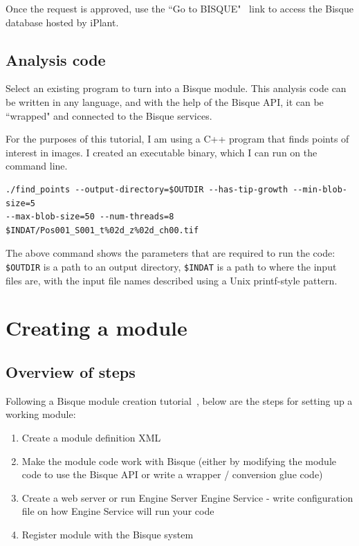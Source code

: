 \documentclass[12pt]{article}
\begin{document}
Once the request is approved, use the 
``Go to BISQUE"~\cite{Bisque-iplant} link to access the 
Bisque database hosted by iPlant.


\subsection{Analysis code}
\label{sec:analysis_code}

Select an existing program to turn into a Bisque module.
This analysis code can be written in any language, and with the help
of the Bisque API, it can be ``wrapped" and connected to the
Bisque services.

For the purposes of this tutorial, I am using a C++ program
that finds points of interest in images. 
I created an executable binary, which I can run on the command line.

\begin{verbatim}
./find_points --output-directory=$OUTDIR --has-tip-growth --min-blob-size=5 
--max-blob-size=50 --num-threads=8 $INDAT/Pos001_S001_t%02d_z%02d_ch00.tif
\end{verbatim}

The above command shows the parameters that are required
to run the code: \texttt{\$OUTDIR} is a path to an output
directory, \texttt{\$INDAT} is a path to where the input files are, 
with the input file names described using a Unix printf-style pattern.

\section{Creating a module}
\label{sec:creating-a-module}
\subsection{Overview of steps}

Following a Bisque module creation tutorial~\cite{Bisque-module-creation}, below are the steps for setting up a working module:
\begin{enumerate}
\item Create a module definition XML
\item Make the module code work with Bisque (either by modifying the module code to use the Bisque API or write a wrapper / conversion glue code)
\item Create a web server or run Engine Server
\subitem Engine Service - write configuration file on how Engine Service will run your code 
\item Register module with the Bisque system 
\end{enumerate}




{\small


}
\end{document}
